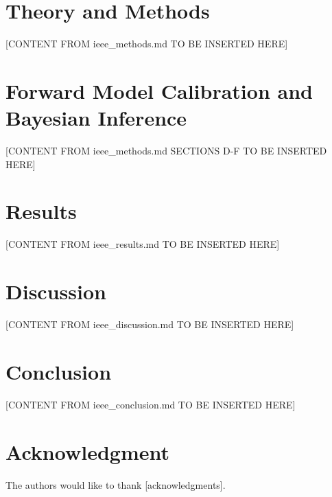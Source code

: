 \documentclass[journal]{IEEEtran}
\begin{document}
\section{Theory and Methods}
\label{sec:methods}

[CONTENT FROM ieee_methods.md TO BE INSERTED HERE]

\section{Forward Model Calibration and Bayesian Inference}
\label{sec:calibration}

[CONTENT FROM ieee_methods.md SECTIONS D-F TO BE INSERTED HERE]

\section{Results}
\label{sec:results}

[CONTENT FROM ieee_results.md TO BE INSERTED HERE]

\section{Discussion}
\label{sec:discussion}

[CONTENT FROM ieee_discussion.md TO BE INSERTED HERE]

\section{Conclusion}
\label{sec:conclusion}

[CONTENT FROM ieee_conclusion.md TO BE INSERTED HERE]

\section*{Acknowledgment}

The authors would like to thank [acknowledgments].

\ifCLASSOPTIONcaptionsoff
  \newpage
\fi

\end{document}
